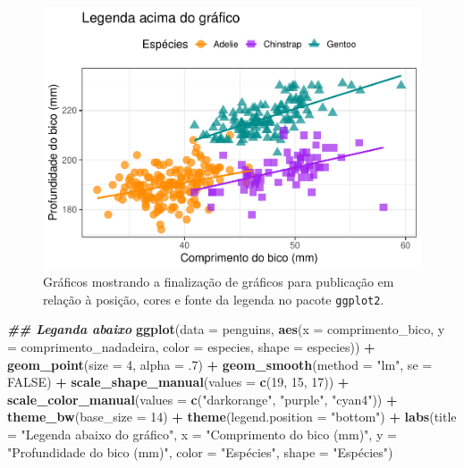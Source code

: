 \documentclass[
]{article}
\newenvironment{Shaded}{\begin{snugshade}}{\end{snugshade}}
\newcommand{\AttributeTok}[1]{\textcolor[rgb]{0.13,0.29,0.53}{#1}}
\newcommand{\ConstantTok}[1]{\textcolor[rgb]{0.56,0.35,0.01}{#1}}
\newcommand{\DecValTok}[1]{\textcolor[rgb]{0.00,0.00,0.81}{#1}}
\newcommand{\DocumentationTok}[1]{\textcolor[rgb]{0.56,0.35,0.01}{\textbf{\textit{#1}}}}
\newcommand{\FunctionTok}[1]{\textcolor[rgb]{0.13,0.29,0.53}{\textbf{#1}}}
\newcommand{\NormalTok}[1]{#1}
\newcommand{\SpecialCharTok}[1]{\textcolor[rgb]{0.81,0.36,0.00}{\textbf{#1}}}
\newcommand{\StringTok}[1]{\textcolor[rgb]{0.31,0.60,0.02}{#1}}
\begin{document}
\begin{figure}
\centering
\includegraphics{epr_files/figure-latex/fig-plot-final-legenda-1.pdf}
\caption{\label{fig:fig-plot-final-legenda-1}Gráficos mostrando a finalização de gráficos para publicação em relação à posição, cores e fonte da legenda no pacote \texttt{ggplot2}.}
\end{figure}

\begin{Shaded}
\begin{Highlighting}[]
\DocumentationTok{\#\# Leganda abaixo}
\FunctionTok{ggplot}\NormalTok{(}\AttributeTok{data =}\NormalTok{ penguins, }
       \FunctionTok{aes}\NormalTok{(}\AttributeTok{x =}\NormalTok{ comprimento\_bico, }\AttributeTok{y =}\NormalTok{ comprimento\_nadadeira,}
           \AttributeTok{color =}\NormalTok{ especies, }\AttributeTok{shape =}\NormalTok{ especies)) }\SpecialCharTok{+}
    \FunctionTok{geom\_point}\NormalTok{(}\AttributeTok{size =} \DecValTok{4}\NormalTok{, }\AttributeTok{alpha =}\NormalTok{ .}\DecValTok{7}\NormalTok{) }\SpecialCharTok{+}
    \FunctionTok{geom\_smooth}\NormalTok{(}\AttributeTok{method =} \StringTok{"lm"}\NormalTok{, }\AttributeTok{se =} \ConstantTok{FALSE}\NormalTok{) }\SpecialCharTok{+}
    \FunctionTok{scale\_shape\_manual}\NormalTok{(}\AttributeTok{values =} \FunctionTok{c}\NormalTok{(}\DecValTok{19}\NormalTok{, }\DecValTok{15}\NormalTok{, }\DecValTok{17}\NormalTok{)) }\SpecialCharTok{+}
    \FunctionTok{scale\_color\_manual}\NormalTok{(}\AttributeTok{values =} \FunctionTok{c}\NormalTok{(}\StringTok{"darkorange"}\NormalTok{, }\StringTok{"purple"}\NormalTok{, }\StringTok{"cyan4"}\NormalTok{)) }\SpecialCharTok{+}
    \FunctionTok{theme\_bw}\NormalTok{(}\AttributeTok{base\_size =} \DecValTok{14}\NormalTok{) }\SpecialCharTok{+}
    \FunctionTok{theme}\NormalTok{(}\AttributeTok{legend.position =} \StringTok{"bottom"}\NormalTok{) }\SpecialCharTok{+}
    \FunctionTok{labs}\NormalTok{(}\AttributeTok{title =} \StringTok{"Legenda abaixo do gráfico"}\NormalTok{, }\AttributeTok{x =} \StringTok{"Comprimento do bico (mm)"}\NormalTok{, }
         \AttributeTok{y =} \StringTok{"Profundidade do bico (mm)"}\NormalTok{, }\AttributeTok{color =} \StringTok{"Espécies"}\NormalTok{, }\AttributeTok{shape =} \StringTok{"Espécies"}\NormalTok{)}
\end{Highlighting}
\end{Shaded}
\end{document}
